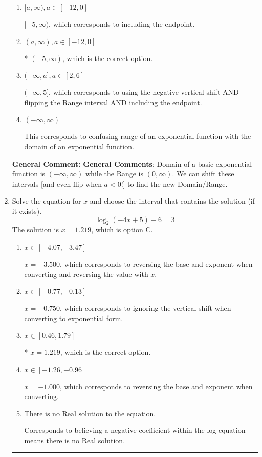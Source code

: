 \documentclass{extbook}[14pt]
\newcommand{\litem}[1]{\item #1

\rule{\textwidth}{0.4pt}}
\begin{document}
\begin{enumerate}
{\begin{enumerate}[label=\Alph*.]
$(-\infty, 5)$, which corresponds to using the negative vertical shift AND flipping the Range interval.
\item \( [a, \infty), a \in [-12, 0] \)

$[-5, \infty)$, which corresponds to including the endpoint.
\item \( (a, \infty), a \in [-12, 0] \)

* $(-5, \infty)$, which is the correct option.
\item \( (-\infty, a], a \in [2, 6] \)

$(-\infty, 5]$, which corresponds to using the negative vertical shift AND flipping the Range interval AND including the endpoint.
\item \( (-\infty, \infty) \)

This corresponds to confusing range of an exponential function with the domain of an exponential function.
\end{enumerate}

\textbf{General Comment:} \textbf{General Comments}: Domain of a basic exponential function is $(-\infty, \infty)$ while the Range is $(0, \infty)$. We can shift these intervals [and even flip when $a<0$!] to find the new Domain/Range.
}
\litem{
Solve the equation for $x$ and choose the interval that contains the solution (if it exists).
\[ \log_{2}{(-4x+5)}+6 = 3 \]The solution is \( x = 1.219 \), which is option C.\begin{enumerate}[label=\Alph*.]
\item \( x \in [-4.07, -3.47] \)

$x = -3.500$, which corresponds to reversing the base and exponent when converting and reversing the value with $x$.
\item \( x \in [-0.77, -0.13] \)

$x = -0.750$, which corresponds to ignoring the vertical shift when converting to exponential form.
\item \( x \in [0.46, 1.79] \)

* $x = 1.219$, which is the correct option.
\item \( x \in [-1.26, -0.96] \)

$x = -1.000$, which corresponds to reversing the base and exponent when converting.
\item \( \text{There is no Real solution to the equation.} \)

Corresponds to believing a negative coefficient within the log equation means there is no Real solution.
\end{enumerate}

}
\end{enumerate}
\end{document}
